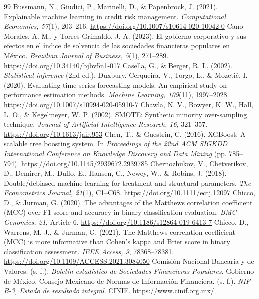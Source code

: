 \begin{thebibliography}{99}
 Bussmann, N., Giudici, P., Marinelli, D., \& Papenbrock, J. (2021). Explainable machine learning in credit risk management. \textit{Computational Economics, 57}(1), 203--216. \url{https://doi.org/10.1007/s10614-020-10042-0}
 Cano Morales, A. M., y Torres Grimaldo, J. A. (2023). El gobierno corporativo y sus efectos en el índice de solvencia de las sociedades financieras populares en México. \textit{Brazilian Journal of Business, 5}(1), 271--289. \url{https://doi.org/10.34140/bjbv5n1-017}
 Casella, G., \& Berger, R. L. (2002). \textit{Statistical inference} (2nd ed.). Duxbury.%
 Cerqueira, V., Torgo, L., \& Mozetič, I. (2020). Evaluating time series forecasting models: An empirical study on performance estimation methods. \textit{Machine Learning, 109}(11), 1997--2028. \url{https://doi.org/10.1007/s10994-020-05910-7}
 Chawla, N. V., Bowyer, K. W., Hall, L. O., \& Kegelmeyer, W. P. (2002). SMOTE: Synthetic minority over-sampling technique. \textit{Journal of Artificial Intelligence Research, 16}, 321--357. \url{https://doi.org/10.1613/jair.953}
 Chen, T., \& Guestrin, C. (2016). XGBoost: A scalable tree boosting system. In \textit{Proceedings of the 22nd ACM SIGKDD International Conference on Knowledge Discovery and Data Mining} (pp. 785--794). \url{https://doi.org/10.1145/2939672.2939785}
 Chernozhukov, V., Chetverikov, D., Demirer, M., Duflo, E., Hansen, C., Newey, W., \& Robins, J. (2018). Double/debiased machine learning for treatment and structural parameters. \textit{The Econometrics Journal, 21}(1), C1--C68. \url{https://doi.org/10.1111/ectj.12097}
 Chicco, D., \& Jurman, G. (2020). The advantages of the Matthews correlation coefficient (MCC) over F1 score and accuracy in binary classification evaluation. \textit{BMC Genomics, 21}, Article 6. \url{https://doi.org/10.1186/s12864-019-6413-7}
 Chicco, D., Warrens, M. J., \& Jurman, G. (2021). The Matthews correlation coefficient (MCC) is more informative than Cohen's kappa and Brier score in binary classification assessment. \textit{IEEE Access, 9}, 78368--78381. \url{https://doi.org/10.1109/ACCESS.2021.3084050}
 Comisión Nacional Bancaria y de Valores. (s. f.). \textit{Boletín estadístico de Sociedades Financieras Populares}. Gobierno de México.
 Consejo Mexicano de Normas de Información Financiera. (s. f.). \textit{NIF B-3, Estado de resultado integral}. CINIF. \url{https://www.cinif.org.mx/}%

\end{thebibliography}
